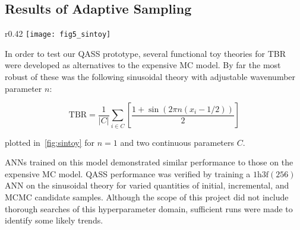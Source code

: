 \subsection{Results of Adaptive Sampling}
\label{sec:adaptiveres}
\begin{wrapfigure}[10]{r}{0.42\textwidth}
	\centering
	\vspace{-13ex}
	\texttt{[image: fig5\_sintoy]}
	\caption{Sinusoidal toy TBR theory over two continuous parameters,
	$n=1$.}
	\label{fig:sintoy}
\end{wrapfigure}

In order to test our QASS prototype, several functional toy theories for TBR were developed as alternatives to the expensive MC model. By far the most robust of these was the following sinusoidal theory with adjustable wavenumber parameter $n$:

\begin{equation}
	\text{TBR} = \frac{1}{|C|}\sum_{i \in C} \left[ \frac{1 + \sin(2\pi n (x_i - 1/2)) }{2} \right]
\end{equation}

plotted in~\cref{fig:sintoy} for $n=1$ and two continuous parameters $C$.

ANNs
trained on this model demonstrated similar performance to those on the expensive
MC model. QASS performance was verified by training a $\text{1h3f}(256)$ ANN on
the sinusoidal theory for varied quantities of initial, incremental, and MCMC
candidate samples. Although the scope of this project did not include thorough
searches of this hyperparameter domain, sufficient runs were made to identify
some likely trends.

